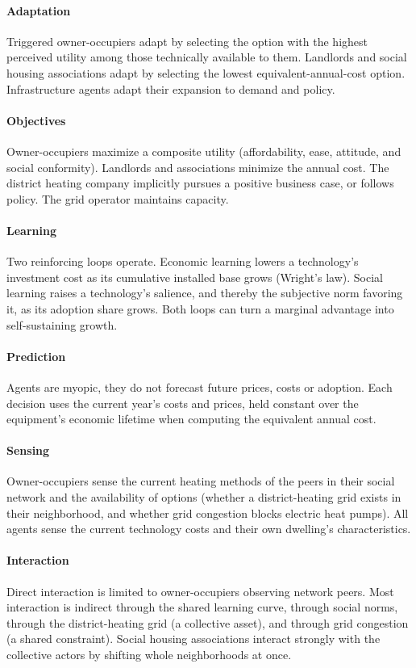 \documentclass[preprint,12pt,authoryear]{elsarticle}
\begin{document}
\paragraph{Adaptation}
Triggered owner-occupiers adapt by selecting the option with the highest
perceived utility among those technically available to them. Landlords and
social housing associations adapt by selecting the lowest
equivalent-annual-cost option. Infrastructure agents adapt their expansion to
demand and policy.

\paragraph{Objectives}
Owner-occupiers maximize a composite utility (affordability, ease,
attitude, and social conformity). Landlords and associations minimize the annual
cost. The district heating company implicitly pursues a positive business case, or
follows policy. The grid operator maintains capacity.

\paragraph{Learning}
Two reinforcing loops operate. Economic learning lowers a technology's
investment cost as its cumulative installed base grows (Wright's law). Social
learning raises a technology's salience, and thereby the subjective norm
favoring it, as its adoption share grows. Both loops can turn a marginal
advantage into self-sustaining growth.

\paragraph{Prediction}
Agents are myopic, they do not forecast future prices, costs or adoption.
Each decision uses the current year's costs and prices, held constant over
the equipment's economic lifetime when computing the equivalent annual cost.

\paragraph{Sensing}
Owner-occupiers sense the current heating methods of the peers in their
social network and the availability of options (whether a district-heating
grid exists in their neighborhood, and whether grid congestion blocks
electric heat pumps). All agents sense the current technology costs and their
own dwelling's characteristics.

\paragraph{Interaction}
Direct interaction is limited to owner-occupiers observing network peers.
Most interaction is indirect through the shared learning curve, through 
social norms, through the district-heating grid (a collective asset), and
through grid congestion (a shared constraint). Social housing associations
interact strongly with the collective actors by shifting whole neighborhoods
at once.
\end{document}
